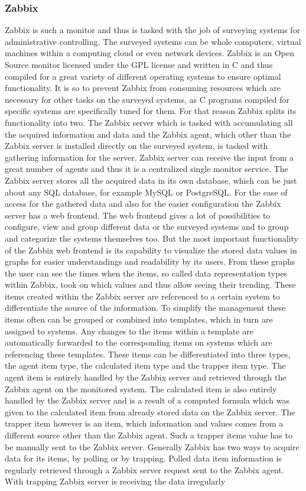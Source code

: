 \subsubsection{Zabbix}
	Zabbix is such a monitor and thus is tasked with the job of surveying systems for administrative controlling. The surveyed systems can be whole computers, virtual machines within a computing cloud or even network devices. Zabbix is an Open Source monitor licensed under the GPL license and written in C and thus compiled for a great variety of different operating systems to ensure optimal functionality. It is so to prevent Zabbix from consuming resources which are necessary for other tasks on the surveyed systems, as C programs compiled for specific systems are specifically tuned for them. For that reason Zabbix splits its functionality into two. The Zabbix server which is tasked with accumulating all the acquired information and data and the Zabbix agent, which other than the Zabbix server is installed directly on the surveyed system, is tasked with gathering information for the server. Zabbix server can receive the input from a great number of agents and thus it is a centralized single monitor service. The Zabbix server stores all the acquired data in its own database, which can be just about any SQL database, for example MySQL or PostgreSQL. For the ease of access for the gathered data and also for the easier configuration the Zabbix server has a web frontend. The web frontend gives a lot of possibilities to configure, view and group different data or the surveyed systems and to group and categorize the systems themselves too. But the most important functionality of the Zabbix web frontend is its capability to visualize the stored data values in graphs for easier understandings and readability by its users. From these graphs the user can see the times when the items, so called data representation types within Zabbix, took on which values and thus allow seeing their trending. These items created within the Zabbix server are referenced to a certain system to differentiate the source of the information. To simplify the management these items often can be grouped or combined into templates, which in turn are assigned to systems. Any changes to the items within a template are automatically forwarded to the corresponding items on systems which are referencing these templates. These items can be differentiated into three types, the agent item type, the calculated item type and the trapper item type. The agent item is entirely handled by the Zabbix server and retrieved through the Zabbix agent on the monitored system. The calculated item is also entirely handled by the Zabbix server and is a result of a computed formula which was given to the calculated item from already stored data on the Zabbix server. The trapper item however is an item, which information and values comes from a different source other than the Zabbix agent. Such a trapper items value has to be manually sent to the Zabbix server. Generally Zabbix has two ways to acquire data for its items, by polling or by trapping. Polled data item information is regularly retrieved through a Zabbix server request sent to the Zabbix agent. With trapping Zabbix server is receiving the data irregularly 